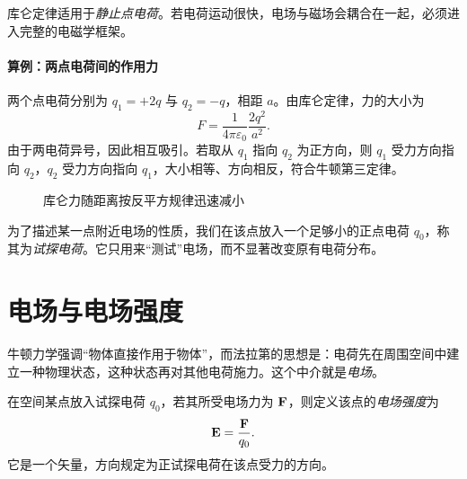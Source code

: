 \begin{remark}
库仑定律适用于\emph{静止点电荷}。若电荷运动很快，电场与磁场会耦合在一起，必须进入完整的电磁学框架。
\end{remark}

\paragraph{算例：两点电荷间的作用力} 两个点电荷分别为 $q_1=+2q$ 与 $q_2=-q$，相距 $a$。由库仑定律，力的大小为
\begin{equation}
F = \frac{1}{4\pi\varepsilon_0}\frac{2q^2}{a^2}.
\end{equation}
由于两电荷异号，因此相互吸引。若取从 $q_1$ 指向 $q_2$ 为正方向，则 $q_1$ 受力方向指向 $q_2$，$q_2$ 受力方向指向 $q_1$，大小相等、方向相反，符合牛顿第三定律。

\begin{figure}[htbp]
\centering
{}
\caption{库仑力随距离按反平方规律迅速减小}
\end{figure}

\begin{definition}[试探电荷]
为了描述某一点附近电场的性质，我们在该点放入一个足够小的正点电荷 $q_0$，称其为\emph{试探电荷}。它只用来“测试”电场，而不显著改变原有电荷分布。
\end{definition}

\section{电场与电场强度}

牛顿力学强调“物体直接作用于物体”，而法拉第的思想是：电荷先在周围空间中建立一种物理状态，这种状态再对其他电荷施力。这个中介就是\emph{电场}。

\begin{definition}[电场与电场强度]
在空间某点放入试探电荷 $q_0$，若其所受电场力为 $\vb{F}$，则定义该点的\emph{电场强度}为
\begin{equation}
\vb{E} = \frac{\vb{F}}{q_0}.
\end{equation}
它是一个矢量，方向规定为正试探电荷在该点受力的方向。
\end{definition}

